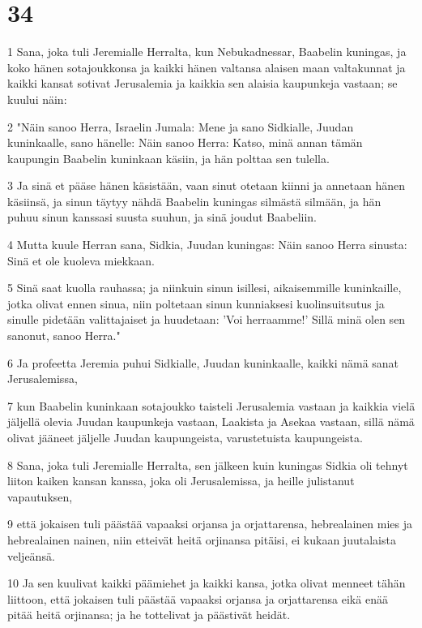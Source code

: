 \chapter{34}

\par 1 Sana, joka tuli Jeremialle Herralta, kun Nebukadnessar, Baabelin kuningas, ja koko hänen sotajoukkonsa ja kaikki hänen valtansa alaisen maan valtakunnat ja kaikki kansat sotivat Jerusalemia ja kaikkia sen alaisia kaupunkeja vastaan; se kuului näin:
\par 2 "Näin sanoo Herra, Israelin Jumala: Mene ja sano Sidkialle, Juudan kuninkaalle, sano hänelle: Näin sanoo Herra: Katso, minä annan tämän kaupungin Baabelin kuninkaan käsiin, ja hän polttaa sen tulella.
\par 3 Ja sinä et pääse hänen käsistään, vaan sinut otetaan kiinni ja annetaan hänen käsiinsä, ja sinun täytyy nähdä Baabelin kuningas silmästä silmään, ja hän puhuu sinun kanssasi suusta suuhun, ja sinä joudut Baabeliin.
\par 4 Mutta kuule Herran sana, Sidkia, Juudan kuningas: Näin sanoo Herra sinusta: Sinä et ole kuoleva miekkaan.
\par 5 Sinä saat kuolla rauhassa; ja niinkuin sinun isillesi, aikaisemmille kuninkaille, jotka olivat ennen sinua, niin poltetaan sinun kunniaksesi kuolinsuitsutus ja sinulle pidetään valittajaiset ja huudetaan: 'Voi herraamme!' Sillä minä olen sen sanonut, sanoo Herra."
\par 6 Ja profeetta Jeremia puhui Sidkialle, Juudan kuninkaalle, kaikki nämä sanat Jerusalemissa,
\par 7 kun Baabelin kuninkaan sotajoukko taisteli Jerusalemia vastaan ja kaikkia vielä jäljellä olevia Juudan kaupunkeja vastaan, Laakista ja Asekaa vastaan, sillä nämä olivat jääneet jäljelle Juudan kaupungeista, varustetuista kaupungeista.
\par 8 Sana, joka tuli Jeremialle Herralta, sen jälkeen kuin kuningas Sidkia oli tehnyt liiton kaiken kansan kanssa, joka oli Jerusalemissa, ja heille julistanut vapautuksen,
\par 9 että jokaisen tuli päästää vapaaksi orjansa ja orjattarensa, hebrealainen mies ja hebrealainen nainen, niin etteivät heitä orjinansa pitäisi, ei kukaan juutalaista veljeänsä.
\par 10 Ja sen kuulivat kaikki päämiehet ja kaikki kansa, jotka olivat menneet tähän liittoon, että jokaisen tuli päästää vapaaksi orjansa ja orjattarensa eikä enää pitää heitä orjinansa; ja he tottelivat ja päästivät heidät.
